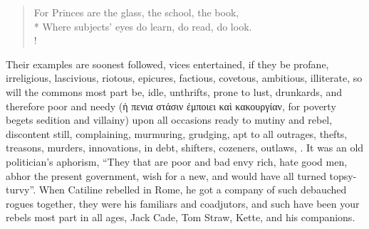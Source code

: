 \begin{verse}%
For Princes are the glass, the school, the book,\\*
Where subjects' eyes do learn, do read, do look.\\!
\end{verse}%


Their examples are soonest followed, vices entertained, if they be profane,
irreligious, lascivious, riotous, epicures, factious, covetous, ambitious,
illiterate, so will the commons most part be, idle, unthrifts, prone to lust,
drunkards, and therefore poor and needy (\textgreek{ἡ πενια στάσιν ἐμποιει καὶ
κακουργίαν}, for poverty begets sedition and villainy) upon all occasions ready
to mutiny and rebel, discontent still, complaining, murmuring, grudging, apt to
all outrages, thefts, treasons, murders, innovations, in debt, shifters,
cozeners, outlaws, . It was an old
politician's aphorism, \enquote{They that are poor and bad envy
rich, hate good men, abhor the present government, wish for a new, and would
have all turned topsy-turvy}. When Catiline rebelled in Rome, he got a company
of such debauched rogues together, they were his familiars and coadjutors, and
such have been your rebels most part in all ages, Jack Cade, Tom Straw, Kette,
and his companions.

